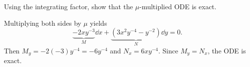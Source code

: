 Using the integrating factor, show that the $\mu$-multiplied ODE is exact.

\nnl Multiplying both sides by $\mu$ yields
$$\underbrace{-2xy^{-3}}_{M} \dd x + \underbrace{(3x^2y^{-4} -y^{-2})}_{N} \dd y = 0.$$
Then $M_y = -2(-3)y^{-4} = -6y^{-4}$ and $N_x = 6xy^{-4}$. Since $M_y = N_x$, the ODE is exact. 